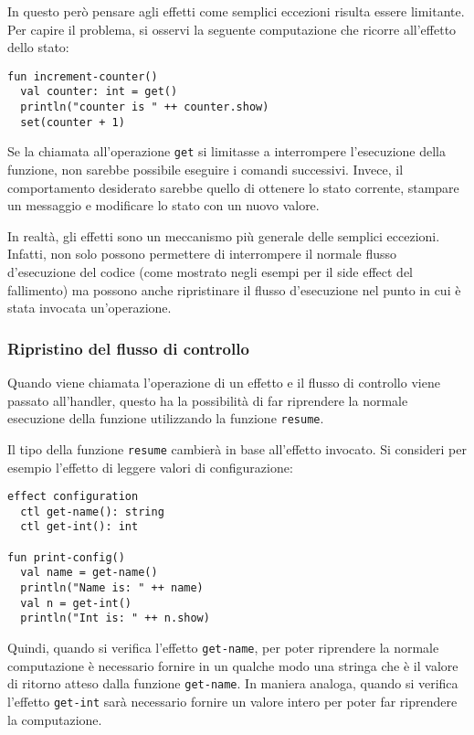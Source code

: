 In questo però pensare agli effetti come semplici eccezioni risulta essere limitante. Per capire il problema, si osservi la seguente computazione che ricorre all'effetto dello stato:
\begin{lstlisting}[language=koka]
fun increment-counter()
  val counter: int = get()
  println("counter is " ++ counter.show)
  set(counter + 1)
\end{lstlisting}
Se la chiamata all'operazione \lstinline{get} si limitasse a interrompere l'esecuzione della funzione, non sarebbe possibile eseguire i comandi successivi. Invece, il comportamento desiderato sarebbe quello di ottenere lo stato corrente, stampare un messaggio e modificare lo stato con un nuovo valore.

In realtà, gli effetti sono un meccanismo più generale delle semplici eccezioni. Infatti, non solo possono permettere di interrompere il normale flusso d'esecuzione del codice (come mostrato negli esempi per il side effect del fallimento) ma possono anche ripristinare il flusso d'esecuzione nel punto in cui è stata invocata un'operazione.

\subsubsection{Ripristino del flusso di controllo}
Quando viene chiamata l'operazione di un effetto e il flusso di controllo viene passato all'handler, questo ha la possibilità di far riprendere la normale esecuzione della funzione utilizzando la funzione \lstinline{resume}.

Il tipo della funzione \lstinline{resume} cambierà in base all'effetto invocato. Si consideri per esempio l'effetto di leggere valori di configurazione:
\begin{lstlisting}[language=koka]
effect configuration
  ctl get-name(): string
  ctl get-int(): int

fun print-config()
  val name = get-name()
  println("Name is: " ++ name)
  val n = get-int()
  println("Int is: " ++ n.show)
\end{lstlisting}

Quindi, quando si verifica l'effetto \lstinline{get-name}, per poter riprendere la normale computazione è necessario fornire in un qualche modo una stringa che è il valore di ritorno atteso dalla funzione \lstinline{get-name}. In maniera analoga, quando si verifica l'effetto \lstinline{get-int} sarà necessario fornire un valore intero per poter far riprendere la computazione.


